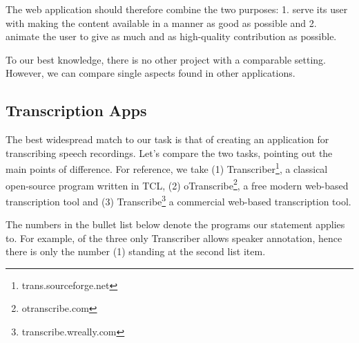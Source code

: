 \documentclass{svproc}
\begin{document}
The web application should therefore combine the two purposes: 1. serve its user
with making the content available in a manner as good as possible and 2. animate
the user to give as much and as high-quality contribution as possible.

To our best knowledge, there is no other project with a comparable setting.
However, we can compare single aspects found in other applications.

\subsection{Transcription Apps}
\label{ssec:diff:trans}

The best widespread match to our task is that of creating an application for
transcribing speech recordings. Let's compare the two tasks, pointing out the
main points of difference. For reference, we take (1)
Transcriber\footnote{trans.sourceforge.net}, a classical open-source program
written in TCL, (2) oTranscribe\footnote{otranscribe.com}, a free modern
web-based transcription tool and (3) Transcribe\footnote{transcribe.wreally.com}
a commercial web-based transcription tool.

The numbers in the bullet list below denote the programs our statement applies
to. For example, of the three only Transcriber allows speaker annotation, hence
there is only the number (1) standing at the second list item.
\end{document}
